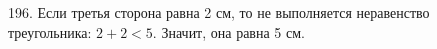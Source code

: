196. Если третья сторона равна 2 см, то не выполняется неравенство треугольника: $2+2<5.$ Значит, она равна 5 см.\\
